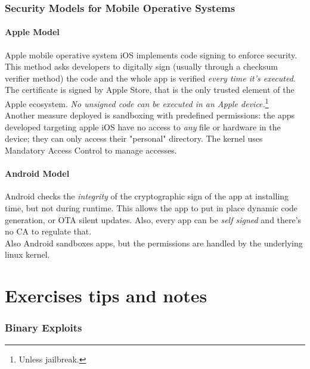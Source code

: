 \documentclass{article}
\begin{document}
		\section{Security Models for Mobile Operative Systems}
			\subsection{Apple Model}
				Apple mobile operative system iOS implements code signing to enforce security. This method asks developers to digitally sign (usually through a checksum verifier method) the code and the whole app is verified \emph{every time it's executed}. The certificate is signed by Apple Store, that is the only trusted element of the Apple ecosystem. \emph{No unsigned code can be executed in an Apple device.}\footnote{Unless jailbreak.}\\
				Another measure deployed is sandboxing with predefined permissions: the apps developed targeting apple iOS have no access to \emph{any} file or hardware in the device; they can only access their "personal" directory. The kernel uses Mandatory Access Control to manage accesses.
			
			\subsection{Android Model}
				Android checks the \emph{integrity} of the cryptographic sign of the app at installing time, but not during runtime. This allows the app to put in place dynamic code generation, or OTA silent updates. Also, every app can be \emph{self signed} and there's no CA to regulate that.\\
				Also Android sandboxes apps, but the permissions are handled by the underlying linux kernel.
			
	\clearpage \part{Exercises tips and notes}
		\section{Binary Exploits}
\end{document}
